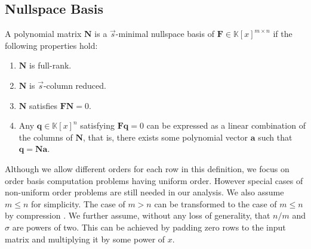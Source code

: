 \subsection{Nullspace Basis}
\begin{defn}
A polynomial matrix $\mathbf{N}$ is a $\vec{s}$-minimal nullspace
basis of $\mathbf{F}\in\mathbb{K}\left[x\right]^{m\times n}$ if the
following properties hold:\end{defn}
\begin{enumerate}
\item $\mathbf{N}$ is full-rank.
\item $\mathbf{N}$ is $\vec{s}$-column reduced. 
\item $\mathbf{N}$ satisfies $\mathbf{F}\mathbf{N}=0$.
\item Any $\mathbf{q}\in\mathbb{K}\left[x\right]^{n}$ satisfying $\mathbf{F}\mathbf{q}=0$
can be expressed as a linear combination of the columns of $\mathbf{N}$,
that is, there exists some polynomial vector $\mathbf{a}$ such that
$\mathbf{q}=\mathbf{N}\mathbf{a}$.
\end{enumerate}
\begin{comment}
Note that the module $\left\langle \left(\mathbf{F},\vec{\sigma}\right)\right\rangle $
does not depend on the shift $\vec{s}$. 
\end{comment}


Although we allow different orders for each row in this definition,
we focus on order basis computation problems having uniform order.
However special cases of non-uniform order problems are still needed
in our analysis. We also assume $m\le n$ for simplicity. The case
of $m>n$ can be transformed to the case of $m\le n$ by compression
\citep{storjohann-villard:2005}. We further assume, without any loss
of generality, that $n/m$ and $\sigma$ are powers of two. This can
be achieved by padding zero rows to the input matrix and multiplying
it by some power of $x$.

